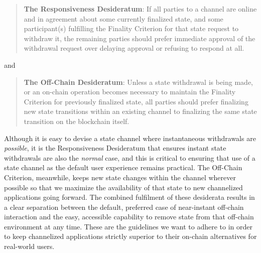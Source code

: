 \documentclass[prb,floatfix,reprint,nofootinbib,amsmath,amssymb,epsfig,pre,floats,letterpaper,groupedaffiliation,tightenlines,allcolors=blue,11pt]{revtex4}
\theoremstyle{definition}
\theoremstyle{definition}
\theoremstyle{definition}
\begin{document}
\begin{quote}
\textbf{The Responsiveness Desideratum}: If all parties to a channel are online and in agreement about some currently finalized state, and some participant(s) fulfilling the Finality Criterion for that state request to withdraw it, the remaining parties should prefer immediate approval of the withdrawal request over delaying approval or refusing to respond at all.
\end{quote}

and

\begin{quote}
\textbf{The Off-Chain Desideratum}: Unless a state withdrawal is being made, or an on-chain operation becomes necessary to maintain the Finality Criterion for previously finalized state, all parties should prefer finalizing new state transitions within an existing channel to finalizing the same state transition on the blockchain itself.
\end{quote}


Although it is easy to devise a state channel where instantaneous withdrawals are \textit{possible}, it is the Responsiveness Desideratum that ensures instant state withdrawals are also the \textit{normal} case, and this is critical to ensuring that use of a state channel as the default user experience remains practical.  The Off-Chain Criterion, meanwhile, keeps new state changes within the channel wherever possible so that we maximize the availability of that state to new channelized applications going forward.  The combined fulfilment of these desiderata results in a clear separation between the default, preferred case of near-instant off-chain interaction and the easy, accessible capability to remove state from that off-chain environment at any time.  These are the guidelines we want to adhere to in order to keep channelized applications strictly superior to their on-chain alternatives for real-world users.

\end{document}
